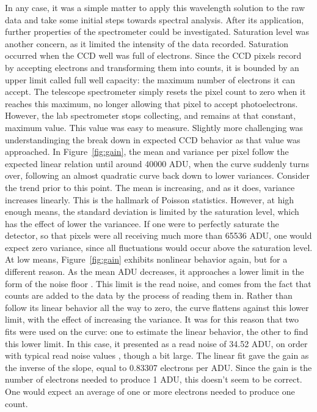 \documentclass[a4paper,12pt]{article}
\begin{document}
In any case, it was a simple matter to apply this wavelength solution to the raw data and take some initial steps towards spectral analysis. After its application, further properties of the spectrometer could be investigated. Saturation level was another concern, as it limited the intensity of the data recorded. Saturation occurred when the CCD well was full of electrons. Since the CCD pixels record by accepting electrons and transforming them into counts, it is bounded by an upper limit called full well capacity: the maximum number of electrons it can accept. The telescope spectrometer simply resets the pixel count to zero when it reaches this maximum, no longer allowing that pixel to accept photoelectrons. However, the lab spectrometer stops collecting, and remains at that constant, maximum value. This value was easy to measure. Slightly more challenging was understandinging the break down in expected CCD behavior as that value was approached. In Figure~\ref{fig:gain}, the mean and variance per pixel follow the expected linear relation until around 40000 ADU, when the curve suddenly turns over, following an almost quadratic curve back down to lower variances. Consider the trend prior to this point. The mean is increasing, and as it does, variance increases linearly. This is the hallmark of Poisson statistics. However, at high enough means, the standard deviation is limited by the saturation level, which has the effect of lower the variancee. If one were to perfectly saturate the detector, so that pixels were all receiving much more than 65536 ADU, one would expect zero variance, since all fluctuations would occur above the saturation level. At low means, Figure~\ref{fig:gain} exhibits nonlinear behavior again, but for a different reason. As the mean ADU decreases, it approaches a lower limit in the form of the noise floor \citep{ccd}. This limit is the read noise, and comes from the fact that counts are added to the data by the process of reading them in. Rather than follow its linear behavior all the way to zero, the curve flattens against this lower limit, with the effect of increasing the variance. It was for this reason that two fits were used on the curve: one to estimate the linear behavior, the other to find this lower limit. In this case, it presented as a read noise of 34.52 ADU, on order with typical read noise values \citep{telescopes}, though a bit large. The linear fit gave the gain as the inverse of the slope, equal to 0.83307 electrons per ADU. Since the gain is the number of electrons needed to produce 1 ADU, this doesn’t seem to be correct. One would expect an average of one or more electrons needed to produce one count.
\end{document}
